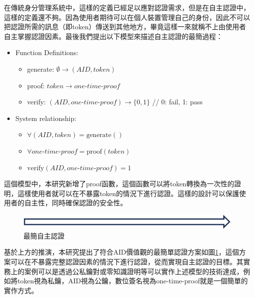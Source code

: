 在傳統身分管理系統中，這樣的定義已經足以應對認證需求，但是在自主認證中，這樣的定義還不夠。因為使用者期待可以在個人裝置管理自己的身份，因此不可以把認證所需的訊息（即token）傳送到其他地方，畢竟這樣一來就稱不上由使用者自主掌握認證因素。最後我們提出以下模型來描述自主認證的最簡過程：
\begin{itemize}
  \item Function Definitions:
  \begin{itemize}
      \item generate: $\emptyset \rightarrow (AID, token)$
      \item proof: $token \rightarrow one\text{-}time\text{-}proof$
      \item verify: $(AID, one\text{-}time\text{-}proof) \rightarrow \{0,1\}$ \hfill // 0: fail, 1: pass
  \end{itemize}
  \item System relationship:
  \begin{itemize}
      \item $\forall(AID, token) = \text{generate}()$
      \item $\forall one\text{-}time\text{-}proof = \text{proof}(token)$
      \item $\text{verify}(AID, one\text{-}time\text{-}proof) = 1$
  \end{itemize}
\end{itemize}
這個模型中，本研究新增了proof函數，這個函數可以將token轉換為一次性的證明，這樣使用者就可以在不暴露token的情況下進行認證。這樣的設計可以保護使用者的自主性，同時確保認證的安全性。

\begin{figure}
  \centering
  \includegraphics[width=\linewidth,keepaspectratio]{figures/min-aid.png}
  \caption{最簡自主認證}
  \label{fig:min-aid}
\end{figure}
基於上方的推演，本研究提出了符合AID價值觀的最簡單認證方案如圖\ref{fig:min-aid}，這個方案可以在不暴露完整認證因素的情況下進行認證，從而實現自主認證的目標。其實務上的案例可以是透過公私鑰對或零知識證明等可以實作上述模型的技術達成，例如將token視為私鑰，AID視為公鑰，數位簽名視為one-time-proof就是一個簡單的實作方式。

